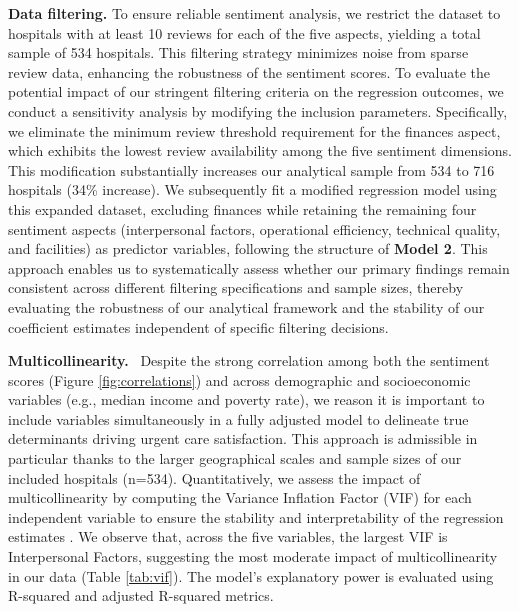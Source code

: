 \documentclass[journal,twoside,web]{ieeecolor}
\begin{document}
\textbf{Data filtering.} To ensure reliable sentiment analysis, we restrict the dataset to hospitals with at least 10 reviews for each of the five aspects, yielding a total sample of 534 hospitals. This filtering strategy minimizes noise from sparse review data, enhancing the robustness of the sentiment scores. To evaluate the potential impact of our stringent filtering criteria on the regression outcomes, we conduct a sensitivity analysis by modifying the inclusion parameters. Specifically, we eliminate the minimum review threshold requirement for the finances aspect, which exhibits the lowest review availability among the five sentiment dimensions. This modification substantially increases our analytical sample from 534 to 716 hospitals (34\% increase). We subsequently fit a modified regression model using this expanded dataset, excluding finances while retaining the remaining four sentiment aspects (interpersonal factors, operational efficiency, technical quality, and facilities) as predictor variables, following the structure of \textbf{Model 2}. This approach enables us to systematically assess whether our primary findings remain consistent across different filtering specifications and sample sizes, thereby evaluating the robustness of our analytical framework and the stability of our coefficient estimates independent of specific filtering decisions.

\textbf{Multicollinearity.}  Despite the strong correlation among both the sentiment scores (Figure \ref{fig:correlations}) and across demographic and socioeconomic variables (e.g., median income and poverty rate), we reason it is important to include variables simultaneously in a fully adjusted model to delineate true determinants driving urgent care satisfaction. This approach is admissible in particular thanks to the larger geographical scales and sample sizes of our included hospitals (n=534). Quantitatively, we assess the impact of multicollinearity by computing the Variance Inflation Factor (VIF) for each independent variable to ensure the stability and interpretability of the regression estimates \cite{obrien2007caution}. We observe that, across the five variables, the largest VIF is Interpersonal Factors, suggesting the most moderate impact of multicollinearity in our data (Table \ref{tab:vif}). The model's explanatory power is evaluated using R-squared and adjusted R-squared metrics.
\end{document}
